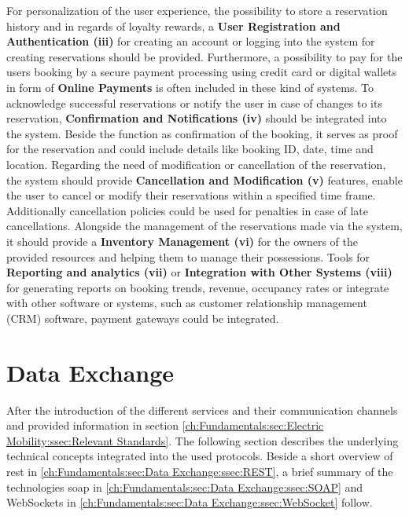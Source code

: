 For personalization of the user experience, the possibility to store a reservation history and in regards of loyalty rewards, a \textbf{User Registration and Authentication (iii)} for creating an account or logging into the system for creating reservations should be provided.
Furthermore, a possibility to pay for the users booking by a secure payment processing using credit card or digital wallets in form of \textbf{Online Payments} is often included in these kind of systems.
To acknowledge successful reservations or notify the user in case of changes to its reservation, \textbf{Confirmation and Notifications (iv)} should be integrated into the system. Beside the function as confirmation of the booking, it serves as proof for the reservation and could include details like booking ID, date, time and location.
Regarding the need of modification or cancellation of the reservation, the system should provide \textbf{Cancellation and Modification (v)} features, enable the user to cancel or modify their reservations within a specified time frame. Additionally  cancellation policies could be used for penalties in case of late cancellations.
Alongside the management of the reservations made via the system, it should provide a \textbf{Inventory Management (vi)} for the owners of the provided resources and helping them to manage their possessions.
Tools for \textbf{Reporting and analytics (vii)} or \textbf{Integration with Other Systems (viii)} for generating reports on booking trends, revenue, occupancy rates or integrate with other software or systems, such as customer relationship management (CRM) software, payment gateways could be integrated.

\section{Data Exchange}
\label{ch:Fundamentals:sec:Data Exchange}

After the introduction of the different services and their communication channels and provided information in section \ref{ch:Fundamentals:sec:Electric Mobility:ssec:Relevant Standards}. The following section describes the underlying technical concepts integrated into the used protocols.
Beside a short overview of \acrfull{rest} in \ref{ch:Fundamentals:sec:Data Exchange:ssec:REST}, a brief summary of the technologies \acrfull{soap} in \ref{ch:Fundamentals:sec:Data Exchange:ssec:SOAP} and WebSockets in \ref{ch:Fundamentals:sec:Data Exchange:ssec:WebSocket} follow. 

